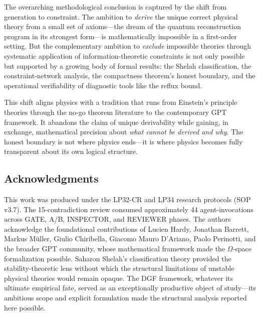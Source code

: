 \documentclass[12pt,a4paper]{article}
\theoremstyle{definition}
\theoremstyle{remark}
\begin{document}
The overarching methodological conclusion is captured by the shift from generation to constraint. The ambition to \emph{derive} the unique correct physical theory from a small set of axioms---the dream of the quantum reconstruction program in its strongest form---is mathematically impossible in a first-order setting. But the complementary ambition to \emph{exclude} impossible theories through systematic application of information-theoretic constraints is not only possible but supported by a growing body of formal results: the Shelah classification, the constraint-network analysis, the compactness theorem's honest boundary, and the operational verifiability of diagnostic tools like the reflux bound.

This shift aligns physics with a tradition that runs from Einstein's principle theories through the no-go theorem literature to the contemporary GPT framework. It abandons the claim of unique derivability while gaining, in exchange, mathematical precision about \emph{what cannot be derived and why}. The honest boundary is not where physics ends---it is where physics becomes fully transparent about its own logical structure.

\subsection*{Acknowledgments}

This work was produced under the LP32-CR and LP34 research protocols (SOP v3.7). The 15-contradiction review consumed approximately 44 agent-invocations across GATE, A/B, INSPECTOR, and REVIEWER phases. The authors acknowledge the foundational contributions of Lucien Hardy, Jonathan Barrett, Markus M\"uller, Giulio Chiribella, Giacomo Mauro D'Ariano, Paolo Perinotti, and the broader GPT community, whose mathematical framework made the $\Omega$-space formalization possible. Saharon Shelah's classification theory provided the stability-theoretic lens without which the structural limitations of unstable physical theories would remain opaque. The DGF framework, whatever its ultimate empirical fate, served as an exceptionally productive object of study---its ambitious scope and explicit formulation made the structural analysis reported here possible.
\end{document}
